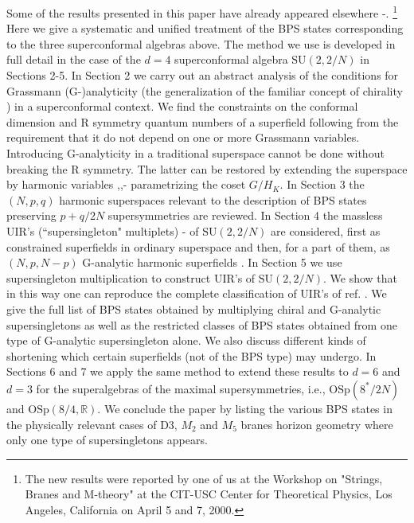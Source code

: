 \documentclass[a4paper,12pt]{article}
\begin{document}
Some of the results presented in this paper have already appeared 
elsewhere \cite{AFSZ}-\cite{FS3}. \footnote{The new results were 
reported by one of us at the Workshop on "Strings, Branes and 
M-theory" at the CIT-USC Center for Theoretical Physics, Los 
Angeles, California on April 5 and 7, 2000.} Here we give a 
systematic and unified treatment of the BPS states corresponding 
to the three superconformal algebras above. The method we use is 
developed in full detail in the case of the $d=4$ superconformal 
algebra $\mbox{SU}(2,2/N)$ in Sections 2-5. In Section 2 we carry 
out an abstract analysis of the conditions for Grassmann 
(G-)analyticity  \cite{GIO} (the generalization of the familiar 
concept of chirality \cite{fwz}) in a superconformal context. We 
find the  constraints on the conformal dimension and R symmetry 
quantum numbers of a superfield following from the requirement 
that it do not depend on one or more Grassmann variables. 
Introducing G-analyticity in a traditional superspace cannot be 
done without breaking the R symmetry. The latter can be restored 
by extending the superspace by harmonic variables 
\cite{Rosly},\cite{GIK1},\cite{GIK11}-\cite{Bandos} parametrizing 
the coset $G/H_K$. In Section 3 the $(N,p,q)$ harmonic 
superspaces \cite{GIK3,hh} relevant to the description of BPS 
states preserving $p+q/2N$ supersymmetries are reviewed. In 
Section 4 the massless UIR's (``supersingleton" multiplets) 
\cite{ff2}-\cite{bin} of $\mbox{SU}(2,2/N)$ are considered, first 
as constrained superfields in ordinary superspace 
\cite{Siegel,HST} and then, for a part of them, as $(N,p,N-p)$ 
G-analytic harmonic superfields \cite{GIK1,hh}. In Section 5 we 
use supersingleton multiplication to construct UIR's of  
$\mbox{SU}(2,2/N)$. We show that in this way one can reproduce 
the complete classification of UIR's of ref. \cite{dp}. We give 
the full list of BPS states obtained by multiplying chiral and 
G-analytic supersingletons as well as the restricted classes of 
BPS states obtained from one type of G-analytic supersingleton 
alone. We also discuss different kinds of shortening which 
certain superfields (not of the BPS type) may undergo. In 
Sections 6 and 7 we apply the same method to extend these results 
to $d=6$ and $d=3$ for the superalgebras of the maximal 
supersymmetries, i.e., $\mbox{OSp}(8^*/2N)$ and 
$\mbox{OSp}(8/4,\mathbb{R})$. We conclude the paper by listing 
the various BPS states in the physically relevant cases of D3, 
$M_2$ and $M_5$ branes horizon geometry where only one type of 
supersingletons appears. 
\end{document}
